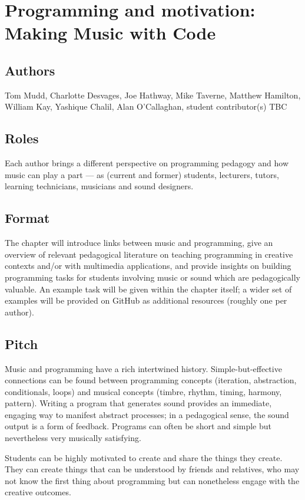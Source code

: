 \section*{Programming and motivation: Making Music with Code}

\subsection*{Authors}
Tom Mudd, Charlotte Desvages, Joe Hathway, Mike Taverne, Matthew Hamilton, William Kay, Yashique Chalil, Alan O'Callaghan, student contributor(s) TBC

\subsection*{Roles}
Each author brings a different perspective on programming pedagogy and how music can play a part --- as (current and former) students, lecturers, tutors, learning technicians, musicians and sound designers.

\subsection*{Format}
The chapter will introduce links between music and programming, give an overview of relevant pedagogical literature on teaching programming in creative contexts and/or with multimedia applications, and provide insights on building programming tasks for students involving music or sound which are pedagogically valuable. An example task will be given within the chapter itself; a wider set of examples will be provided on GitHub as additional resources (roughly one per author).

\subsection*{Pitch}
Music and programming have a rich intertwined history. Simple-but-effective connections can be found between programming concepts (iteration, abstraction, conditionals, loops) and musical concepts (timbre, rhythm, timing, harmony, pattern). Writing a program that generates sound provides an immediate, engaging way to manifest abstract processes; in a pedagogical sense, the sound output is a form of feedback. Programs can often be short and simple but nevertheless very musically satisfying. 

Students can be highly motivated to create and share the things they create. They can create things that can be understood by friends and relatives, who may not know the first thing about programming but can nonetheless engage with the creative outcomes.

